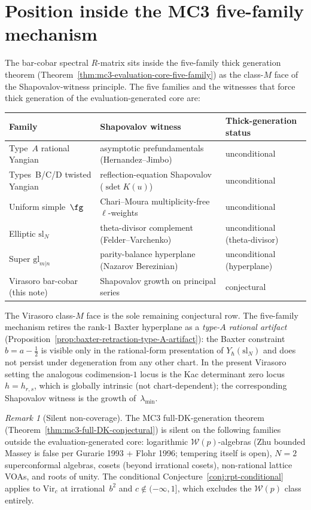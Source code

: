 \documentclass[11pt]{amsart}
\theoremstyle{definition}
\theoremstyle{remark}
\newtheorem{remark}[theorem]{Remark}
\begin{document}
\section{Position inside the MC3 five-family mechanism}

The bar-cobar spectral $R$-matrix sits inside the five-family thick
generation theorem
(Theorem~\ref*{thm:mc3-evaluation-core-five-family}) as the
class-$M$ face of the Shapovalov-witness principle. The five
families and the witnesses that force thick generation of the
evaluation-generated core are:

\begin{center}
\renewcommand{\arraystretch}{1.3}
\begin{tabular}{lll}
\textbf{Family} & \textbf{Shapovalov witness} & \textbf{Thick-generation status} \\
\hline
Type~$A$ rational Yangian & asymptotic prefundamentals (Hernandez--Jimbo) &
unconditional \\
Types~B/C/D twisted Yangian & reflection-equation Shapovalov
($\operatorname{sdet}K(u)$) & unconditional \\
Uniform simple~$\fg$ & Chari--Moura multiplicity-free
$\ell$-weights & unconditional \\
Elliptic $\mathrm{sl}_N$ & theta-divisor complement
(Felder--Varchenko) & unconditional (theta-divisor) \\
Super $\mathrm{gl}_{m|n}$ & parity-balance hyperplane (Nazarov
Berezinian) & unconditional (hyperplane) \\
\hline
Virasoro bar-cobar (this note) & Shapovalov growth on principal
series & conjectural
\end{tabular}
\end{center}

The Virasoro class-$M$ face is the sole remaining conjectural row.
The five-family mechanism retires the rank-$1$ Baxter hyperplane as a
\emph{type-$A$ rational artifact}
(Proposition~\ref*{prop:baxter-retraction-type-A-artifact}): the
Baxter constraint $b = a - \tfrac12$ is visible only in the
rational-form presentation of $Y_\hbar(\mathrm{sl}_N)$ and does not
persist under degeneration from any other chart. In the present
Virasoro setting the analogous codimension-$1$ locus is the Kac
determinant zero locus $h = h_{r,s}$, which is globally intrinsic
(not chart-dependent); the corresponding Shapovalov witness is the
growth of~$\lambda_{\min}$.

\begin{remark}[Silent non-coverage]
\label{rem:silent-non-coverage}
The MC3 full-DK-generation theorem
(Theorem~\ref*{thm:mc3-full-DK-conjectural}) is silent on the
following families outside the evaluation-generated core: logarithmic
$\mathcal{W}(p)$-algebras (Zhu bounded Massey is false per Gurarie
1993 + Flohr 1996; tempering itself is open), $N = 2$ superconformal
algebras, cosets (beyond irrational cosets), non-rational lattice
VOAs, and roots of unity. The conditional Conjecture~\ref{conj:rpt-conditional}
applies to $\mathrm{Vir}_c$ at irrational~$b^2$ and $c \not\in
(-\infty, 1]$, which excludes the $\mathcal{W}(p)$ class entirely.
\end{remark}
\end{document}
